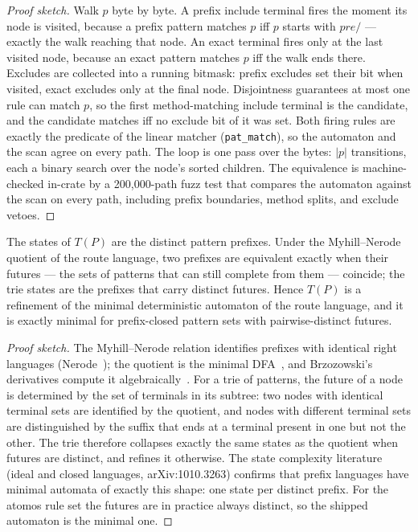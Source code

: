 \begin{proof}[Proof sketch]
Walk $p$ byte by byte. A prefix include terminal fires the moment its
node is visited, because a prefix pattern matches $p$ iff $p$ starts
with $\mathit{pre}/$ --- exactly the walk reaching that node. An exact
terminal fires only at the last visited node, because an exact pattern
matches $p$ iff the walk ends there. Excludes are collected into a
running bitmask: prefix excludes set their bit when visited, exact
excludes only at the final node. Disjointness guarantees at most one
rule can match $p$, so the first method-matching include terminal is the
candidate, and the candidate matches iff no exclude bit of it was set.
Both firing rules are exactly the predicate of the linear matcher
(\texttt{pat\_match}), so the automaton and the scan agree on every
path. The loop is one pass over the bytes: $|p|$ transitions, each a
binary search over the node's sorted children. The equivalence is
machine-checked in-crate by a 200{,}000-path fuzz test that compares the
automaton against the scan on every path, including prefix boundaries,
method splits, and exclude vetoes.
\end{proof}

\begin{theorem}\label{nt:65}
The states of $T(P)$ are the distinct pattern prefixes. Under the
Myhill--Nerode quotient of the route language, two prefixes are
equivalent exactly when their futures --- the sets of patterns that can
still complete from them --- coincide; the trie states are the prefixes
that carry distinct futures. Hence $T(P)$ is a refinement of the minimal
deterministic automaton of the route language, and it is exactly minimal
for prefix-closed pattern sets with pairwise-distinct futures.
\end{theorem}

\begin{proof}[Proof sketch]
The Myhill--Nerode relation identifies prefixes with identical right
languages (Nerode~\cite{nerode}); the quotient is the minimal
DFA~\cite{hopcroft}, and Brzozowski's derivatives compute it
algebraically~\cite{brzozowski}. For a trie of patterns, the future of a
node is determined by the set of terminals in its subtree: two nodes
with identical terminal sets are identified by the quotient, and nodes
with different terminal sets are distinguished by the suffix that ends
at a terminal present in one but not the other. The trie therefore
collapses exactly the same states as the quotient when futures are
distinct, and refines it otherwise. The state complexity literature
(ideal and closed languages, arXiv:1010.3263) confirms that prefix
languages have minimal automata of exactly this shape: one state per
distinct prefix. For the atomos rule set the futures are in practice
always distinct, so the shipped automaton is the minimal one.
\end{proof}

